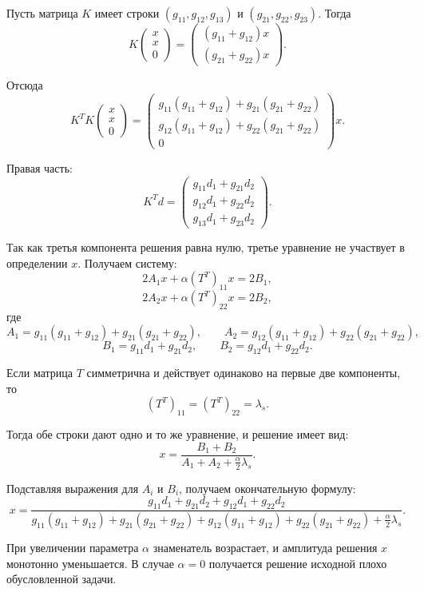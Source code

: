 \documentclass[a4paper,14pt,oneside,openany]{extarticle}
\begin{document}
Пусть матрица \(K\) имеет строки \((g_{11}, g_{12}, g_{13})\) и \((g_{21}, g_{22}, g_{23})\). Тогда
\[
K \begin{pmatrix} x \\ x \\ 0 \end{pmatrix}
= 
\begin{pmatrix}
(g_{11}+g_{12})x \\
(g_{21}+g_{22})x
\end{pmatrix}.
\]

Отсюда
\[
K^T K \begin{pmatrix} x \\ x \\ 0 \end{pmatrix}
=
\begin{pmatrix}
g_{11}(g_{11}+g_{12}) + g_{21}(g_{21}+g_{22}) \\
g_{12}(g_{11}+g_{12}) + g_{22}(g_{21}+g_{22}) \\
0
\end{pmatrix} x.
\]

Правая часть:
\[
K^T d =
\begin{pmatrix}
g_{11} d_1 + g_{21} d_2 \\
g_{12} d_1 + g_{22} d_2 \\
g_{13} d_1 + g_{23} d_2
\end{pmatrix}.
\]

Так как третья компонента решения равна нулю, третье уравнение не участвует в определении \(x\).
Получаем систему:
\[
2A_1 x + \alpha (T^T)_{11} x = 2B_1,
\]
\[
2A_2 x + \alpha (T^T)_{22} x = 2B_2,
\]
где
\[
A_1 = g_{11}(g_{11}+g_{12}) + g_{21}(g_{21}+g_{22}), \qquad
A_2 = g_{12}(g_{11}+g_{12}) + g_{22}(g_{21}+g_{22}),
\]
\[
B_1 = g_{11} d_1 + g_{21} d_2, \qquad
B_2 = g_{12} d_1 + g_{22} d_2.
\]

Если матрица \(T\) симметрична и действует одинаково на первые две компоненты, то
\[
(T^T)_{11} = (T^T)_{22} = \lambda_s.
\]

Тогда обе строки дают одно и то же уравнение, и решение имеет вид:
\[
x = \frac{B_1 + B_2}{A_1 + A_2 + \frac{\alpha}{2}\lambda_s}.
\]

Подставляя выражения для \(A_i\) и \(B_i\), получаем окончательную формулу:
\[
x = \frac{g_{11}d_1 + g_{21}d_2 + g_{12}d_1 + g_{22}d_2}
{g_{11}(g_{11}+g_{12}) + g_{21}(g_{21}+g_{22}) + g_{12}(g_{11}+g_{12}) + g_{22}(g_{21}+g_{22}) + \frac{\alpha}{2}\lambda_s}.
\]


При увеличении параметра \(\alpha\) знаменатель возрастает, и амплитуда решения \(x\) монотонно уменьшается. 
В случае \(\alpha = 0\) получается решение исходной плохо обусловленной задачи.
\end{document}
